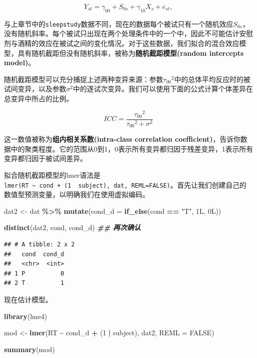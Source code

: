 \documentclass[
]{book}
\newenvironment{Shaded}{\begin{snugshade}}{\end{snugshade}}
\newcommand{\AttributeTok}[1]{\textcolor[rgb]{0.13,0.29,0.53}{#1}}
\newcommand{\ConstantTok}[1]{\textcolor[rgb]{0.56,0.35,0.01}{#1}}
\newcommand{\DecValTok}[1]{\textcolor[rgb]{0.00,0.00,0.81}{#1}}
\newcommand{\DocumentationTok}[1]{\textcolor[rgb]{0.56,0.35,0.01}{\textbf{\textit{#1}}}}
\newcommand{\FunctionTok}[1]{\textcolor[rgb]{0.13,0.29,0.53}{\textbf{#1}}}
\newcommand{\NormalTok}[1]{#1}
\newcommand{\OtherTok}[1]{\textcolor[rgb]{0.56,0.35,0.01}{#1}}
\newcommand{\SpecialCharTok}[1]{\textcolor[rgb]{0.81,0.36,0.00}{\textbf{#1}}}
\newcommand{\StringTok}[1]{\textcolor[rgb]{0.31,0.60,0.02}{#1}}
\begin{document}
\begin{equation}
Y_{st} = \gamma_{00} + S_{0s} + \gamma_{10} X_s + e_{st},
\end{equation}

与上章节中的\texttt{sleepstudy}数据不同，现在的数据每个被试只有一个随机效应\(S_{0s}\)，没有随机斜率。每个被试只出现在两个处理条件中的一个中，因此不可能估计安慰剂与酒精的效应在被试之间的变化情况。对于这些数据，我们拟合的混合效应模型，具有随机截距但没有随机斜率，被称为\textbf{随机截距模型(random intercepts model)}。

随机截距模型可以充分捕捉上述两种变异来源：参数\({\tau_{00}}^2\)中的总体平均反应时的被试间变异，以及参数\(\sigma^2\)中的逐试次变异。我们可以使用下面的公式计算个体差异在总变异中所占的比例。

\[ICC = \frac{{\tau_{00}}^2}{{\tau_{00}}^2 + \sigma^2}\]

这一数值被称为\textbf{组内相关系数(intra-class correlation coefficient)}，告诉你数据中的聚类程度。它的范围从0到1，0表示所有变异都归因于残差变异，1表示所有变异都归因于被试间差异。

拟合随机截距模型的lmer语法是\texttt{lmer(RT\ \textasciitilde{}\ cond\ +\ (1\ \textbar{}\ subject),\ dat,\ REML=FALSE)}。首先让我们创建自己的数值型预测变量，以明确我们在使用虚拟编码。

\begin{Shaded}
\begin{Highlighting}[]
\NormalTok{dat2 }\OtherTok{\textless{}{-}}\NormalTok{ dat }\SpecialCharTok{\%\textgreater{}\%}
  \FunctionTok{mutate}\NormalTok{(}\AttributeTok{cond\_d =} \FunctionTok{if\_else}\NormalTok{(cond }\SpecialCharTok{==} \StringTok{"T"}\NormalTok{, 1L, 0L))}

\FunctionTok{distinct}\NormalTok{(dat2, cond, cond\_d)  }\DocumentationTok{\#\# 再次确认}
\end{Highlighting}
\end{Shaded}

\begin{verbatim}
## # A tibble: 2 x 2
##   cond  cond_d
##   <chr>  <int>
## 1 P          0
## 2 T          1
\end{verbatim}

现在估计模型。

\begin{Shaded}
\begin{Highlighting}[]
\FunctionTok{library}\NormalTok{(lme4)}

\NormalTok{mod }\OtherTok{\textless{}{-}} \FunctionTok{lmer}\NormalTok{(RT }\SpecialCharTok{\textasciitilde{}}\NormalTok{ cond\_d }\SpecialCharTok{+}\NormalTok{ (}\DecValTok{1} \SpecialCharTok{|}\NormalTok{ subject), dat2, }\AttributeTok{REML =} \ConstantTok{FALSE}\NormalTok{)}

\FunctionTok{summary}\NormalTok{(mod)}
\end{Highlighting}
\end{Shaded}
\end{document}
